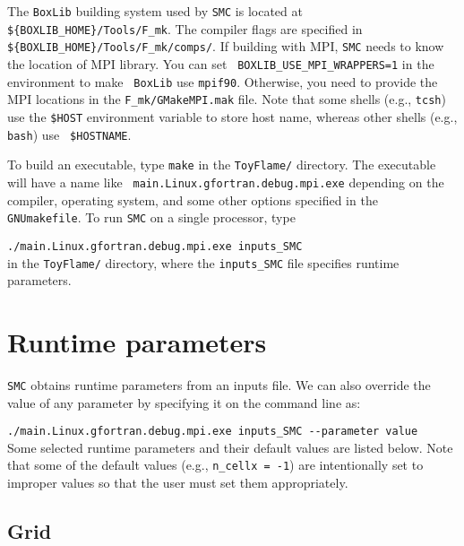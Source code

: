 \documentclass[11pt,letterpaper]{article}
\begin{document}
The {\tt BoxLib} building system used by {\tt SMC} is located at {\tt
  \$\{BOXLIB\_HOME\}/Tools/F\_mk}.  The compiler flags are specified
in {\tt \$\{BOXLIB\_HOME\}/Tools/F\_mk/comps/}.  If building with MPI,
{\tt SMC} needs to know the location of MPI library.  You can set {\tt
  BOXLIB\_USE\_MPI\_WRAPPERS=1} in the environment to make {\tt
  BoxLib} use {\tt mpif90}.  Otherwise, you need to provide the MPI
locations in the {\tt F\_mk/GMakeMPI.mak} file.  Note that some shells
(e.g., {\tt tcsh}) use the {\tt \$HOST} environment variable to store
host name, whereas other shells (e.g., {\tt bash}) use {\tt
  \$HOSTNAME}.

To build an executable, type {\tt make} in the {\tt ToyFlame/}
directory.  The executable will have a name like {\tt
  main.Linux.gfortran.debug.mpi.exe} depending on the compiler,
operating system, and some other options specified in the {\tt
  GNUmakefile}.  To run {\tt SMC} on a single processor, type
\vspace{5pt}

\verb|./main.Linux.gfortran.debug.mpi.exe inputs_SMC|\vspace{5pt}\\
in the {\tt ToyFlame/} directory, where the {\tt inputs\_SMC} file
specifies runtime parameters. 

\section{Runtime parameters}

{\tt SMC} obtains runtime parameters from an inputs file.  We can also
override the value of any parameter by specifying it on the
command line as:\vspace{5pt}

\verb|./main.Linux.gfortran.debug.mpi.exe inputs_SMC --parameter value|\\

Some selected runtime parameters and their default values are listed
below.  Note that some of the default values (e.g., {\tt n\_cellx =
  -1}) are intentionally set to improper values so that the user must
set them appropriately.

\subsection{Grid}
\end{document}
